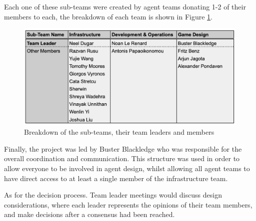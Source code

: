 Each one of these sub-teams were created by agent teams donating 1-2 of their members to each, the breakdown of each team is shown in Figure \ref{fig:subteams}.

\begin{figure}[htb]
    \centering
    \includegraphics[scale=0.6]{000_introduction/images/agentteams.png}
    \caption{Breakdown of the sub-teams, their team leaders and members}
    \label{fig:subteams}
\end{figure}


Finally, the project was led by Buster Blackledge who was responsible for the overall coordination and communication. This structure was used in order to allow everyone to be involved in agent design, whilst allowing all agent teams to have direct access to at least a single member of the infrastructure team. 

As for the decision process. Team leader meetings would discuss design considerations, where each leader represents the opinions of their team members, and make decisions after a consensus had been reached. 